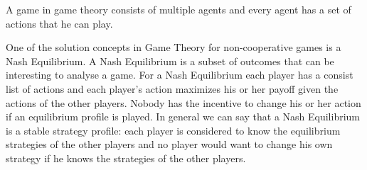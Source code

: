 A game in game theory consists of multiple agents and every agent has a set of actions that he can play. 



One of the solution concepts in Game Theory for non-cooperative games is a Nash Equilibrium. A Nash Equilibrium is a subset of outcomes that can be interesting to analyse a game. For a Nash Equilibrium each player has a consist list of actions and each player's action maximizes his or her payoff given the actions of the other players. Nobody has the incentive to change his or her action if an equilibrium profile is played. In general we can say that a Nash Equilibrium is a stable strategy profile: each player is considered to know the equilibrium strategies of the other players and no player would want to change his own strategy if he knows the strategies of the other players. 



